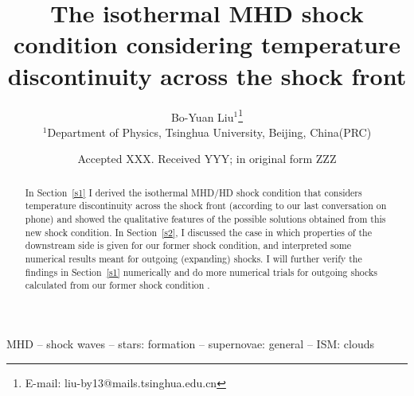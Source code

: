 \documentclass[fleqn,usenatbib]{mnras}
\title[Report on October 15]{The isothermal MHD shock condition considering temperature discontinuity across the shock front}
\author[Bo-Yuan Liu]{Bo-Yuan Liu$^{1}$\thanks{E-mail: liu-by13@mails.tsinghua.edu.cn}
\\
$^{1}$Department of Physics, Tsinghua University, Beijing, China(PRC)\\
}
\date{Accepted XXX. Received YYY; in original form ZZZ}
\begin{document}
\label{firstpage}
\pagerange{\pageref{firstpage}--\pageref{lastpage}}
\maketitle
\begin{abstract}
In Section~\ref{s1} I derived the isothermal MHD/HD shock condition that considers temperature discontinuity across the shock front (according to our last conversation on phone) and showed the qualitative features of the possible solutions obtained from this new shock condition. In Section~\ref{s2}, I discussed the case in which properties of the downstream side is given for our former shock condition, and interpreted some numerical results meant for outgoing (expanding) shocks. I will further verify the findings in Section~\ref{s1} numerically and do more numerical trials for outgoing shocks calculated from our former shock condition . 
\end{abstract}
\begin{keywords}
MHD -- shock waves -- stars: formation -- supernovae: general -- ISM: clouds
\end{keywords}



\end{document}
